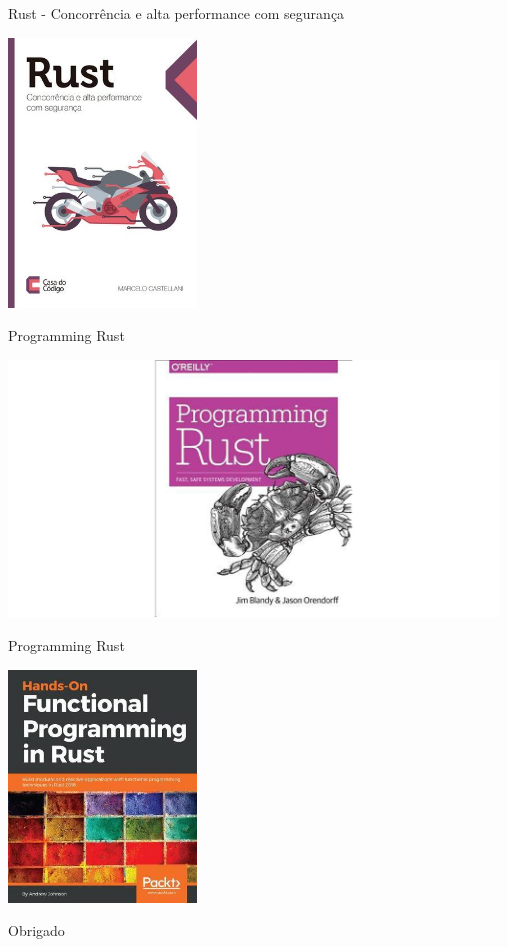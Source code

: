 \documentclass[aspectratio=169]{beamer}
\begin{document}
\begin{frame}{Rust - Concorrência e alta performance com segurança}
	\begin{center}
		\includegraphics[width=5.0cm]{imgs/casa-do-codigo-rust.jpg}	
	\end{center}
\end{frame}

\begin{frame}{Programming Rust}
	\begin{center}
		\includegraphics[width=13.0cm]{imgs/programming-rust.jpg}	
	\end{center}
\end{frame}

\begin{frame}{Programming Rust}
	\begin{center}
		\includegraphics[width=5.0cm]{imgs/hands-on-functional-programming-in-rust.jpg}	
	\end{center}
\end{frame}

\begin{frame}[standout]
  Obrigado
\end{frame}
\end{document}
